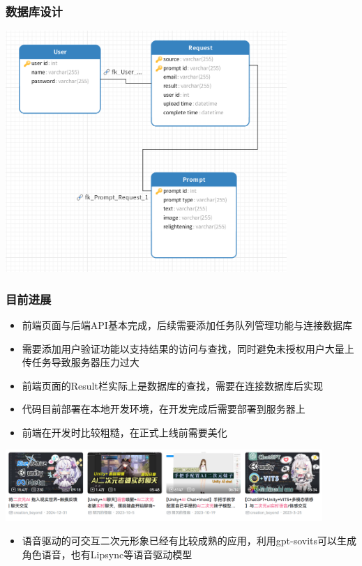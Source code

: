 \documentclass{beamer}
\begin{document}
\begin{frame}
    \frametitle{数据库设计}
    \includegraphics[width=0.8\textwidth]{pic3.png}
\end{frame}

\begin{frame}
    \frametitle{目前进展}
    \begin{itemize}
        \item 前端页面与后端API基本完成，后续需要添加任务队列管理功能与连接数据库
        \item 需要添加用户验证功能以支持结果的访问与查找，同时避免未授权用户大量上传任务导致服务器压力过大
        \item 前端页面的Result栏实际上是数据库的查找，需要在连接数据库后实现
        \item 代码目前部署在本地开发环境，在开发完成后需要部署到服务器上
        \item 前端在开发时比较粗糙，在正式上线前需要美化
    \end{itemize}

\end{frame}

\begin{frame}
    \includegraphics[width=0.9\textwidth]{pic4.png}
    \begin{itemize}
        \item 语音驱动的可交互二次元形象已经有比较成熟的应用，利用gpt-sovits可以生成角色语音，也有Lipsync等语音驱动模型
    \end{itemize}
\end{frame}
\end{document}
